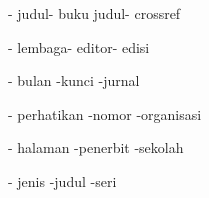 \begin{itemize}
\begin{itemize}
\hspace*{0.5in}- judul\hspace*{0.5in}\hspace*{0.5in}\hspace*{0.5in}- buku judul\hspace*{0.5in}\hspace*{0.5in}- crossref\par

\hspace*{0.5in}- lembaga\hspace*{0.5in}\hspace*{0.5in}- editor\hspace*{0.5in}\hspace*{0.5in}\hspace*{0.5in}- edisi\par

\hspace*{0.5in}- bulan \hspace*{0.5in}\hspace*{0.5in}-kunci \hspace*{0.5in}\hspace*{0.5in}\hspace*{0.5in}-jurnal\hspace*{0.5in}\par

\hspace*{0.5in}- perhatikan \hspace*{0.5in}\hspace*{0.5in}-nomor \hspace*{0.5in}\hspace*{0.5in}-organisasi\par

\hspace*{0.5in}- halaman \hspace*{0.5in}\hspace*{0.5in}-penerbit \hspace*{0.5in}\hspace*{0.5in}-sekolah\par

\hspace*{0.5in}- jenis \hspace*{0.5in}\hspace*{0.5in}\hspace*{0.5in}-judul \hspace*{0.5in}\hspace*{0.5in}\hspace*{0.5in}-seri\par


\end{itemize}
\end{itemize}
